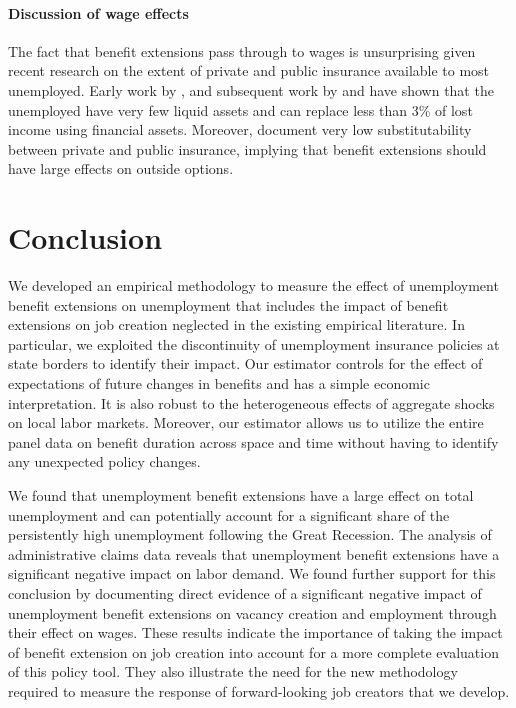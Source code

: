 \documentclass[12pt]{article}
\newcommand{\1}{\mathbf{1}}
\begin{document}
\begin{table}[t]
  \centering
   \caption{Unemployment Benefit Extensions and Wages} \label{tab:Benefits_on_Wages}
\small

\vspace{-0.2cm}
\end{table}



\paragraph{Discussion of wage effects}

The fact that benefit extensions pass through to wages is unsurprising given recent research on the extent of private and public insurance available to most unemployed. Early work by \citet{gruber1997consumption}, and subsequent work by \citet{krueger2016macroeconomics} and \cite{herkenhoff2019impact} have shown that the unemployed have very few liquid assets and can replace less than 3\% of lost income using financial assets. Moreover, \citet{braxton2024can} document very low substitutability between private and public insurance, implying that benefit extensions should have large effects on outside options.


\section{Conclusion}
We developed an empirical methodology to measure the effect of unemployment benefit extensions on unemployment that includes the impact of benefit extensions on job creation neglected in the existing empirical literature. In particular, we exploited the discontinuity of unemployment insurance policies at state borders to identify their impact. Our estimator controls for the effect of expectations of future changes in benefits and has a simple economic interpretation. It is also robust to the heterogeneous effects of aggregate shocks on local labor markets.  Moreover, our estimator allows us to utilize
the entire panel data on benefit duration across space and time without having to identify any unexpected policy changes.

We found that unemployment benefit extensions have a large effect on total unemployment and can potentially account for a significant share of the persistently high unemployment following the Great Recession. The analysis of administrative claims data reveals that unemployment benefit extensions have a significant negative impact on labor demand. We found further support for this conclusion by documenting direct evidence of a significant negative impact of unemployment benefit extensions on vacancy creation and employment through their effect on wages. These results indicate the importance of taking the impact of benefit extension on job creation into account for a more complete evaluation of this policy tool. They also illustrate the need for the new methodology required to measure the response of forward-looking job creators that we develop.
\end{document}
